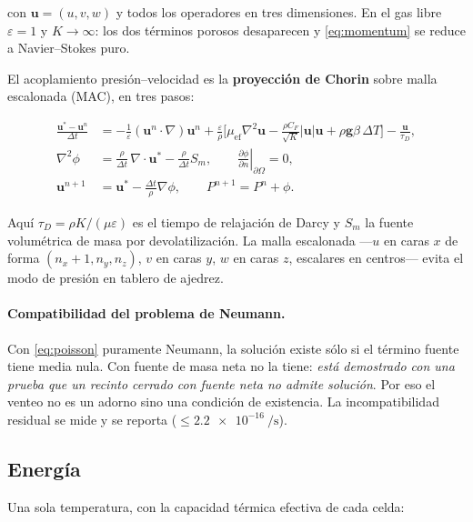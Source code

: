 con $\mathbf{u} = (u,v,w)$ y todos los operadores en tres dimensiones. En el gas
libre $\varepsilon = 1$ y $K \rightarrow \infty$: los dos términos porosos
desaparecen y \eqref{eq:momentum} se reduce a Navier--Stokes puro.

El acoplamiento presión--velocidad es la \textbf{proyección de Chorin} sobre
malla escalonada (MAC), en tres pasos:

\begin{align}
\frac{\mathbf{u}^{*}-\mathbf{u}^{n}}{\Delta t}
&= -\frac{1}{\varepsilon}(\mathbf{u}^{n}\!\cdot\!\nabla)\mathbf{u}^{n}
+ \frac{\varepsilon}{\rho}\Big[\mu_{\mathrm{ef}}\nabla^{2}\mathbf{u}
- \frac{\rho C_F}{\sqrt K}|\mathbf{u}|\mathbf{u}
+ \rho\mathbf{g}\beta\,\Delta T\Big]
- \frac{\mathbf{u}}{\tau_D},
\label{eq:predictor}\\[4pt]
\nabla^{2}\phi &= \frac{\rho}{\Delta t}\,\nabla\!\cdot\!\mathbf{u}^{*} - \frac{\rho}{\Delta t} S_m,
\qquad \left.\frac{\partial \phi}{\partial n}\right|_{\partial\Omega} = 0,
\label{eq:poisson}\\[4pt]
\mathbf{u}^{n+1} &= \mathbf{u}^{*} - \frac{\Delta t}{\rho}\nabla\phi,
\qquad P^{n+1} = P^{n} + \phi .
\label{eq:correccion}
\end{align}

Aquí $\tau_D = \rho K/(\mu\varepsilon)$ es el tiempo de relajación de Darcy y
$S_m$ la fuente volumétrica de masa por devolatilización. La malla escalonada
---$u$ en caras $x$ de forma $(n_x{+}1, n_y, n_z)$, $v$ en caras $y$, $w$ en
caras $z$, escalares en centros--- evita el modo de presión en tablero de
ajedrez.

\paragraph{Compatibilidad del problema de Neumann.} Con \eqref{eq:poisson}
puramente Neumann, la solución existe sólo si el término fuente tiene media
nula. Con fuente de masa neta no la tiene: \emph{está demostrado con una prueba
que un recinto cerrado con fuente neta no admite solución}. Por eso el venteo no
es un adorno sino una condición de existencia. La incompatibilidad residual se
mide y se reporta ($\leq\SI{2.2e-16}{\per\second}$).

\subsection{Energía}

Una sola temperatura, con la capacidad térmica efectiva de cada celda:

